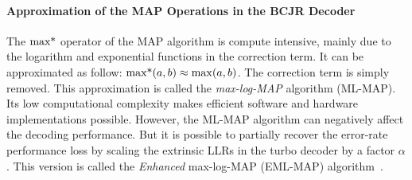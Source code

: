 

\paragraph{Approximation of the MAP Operations in the BCJR Decoder}


The $\operatorname*{max*}$ operator of the MAP algorithm is compute intensive, mainly due to
the logarithm and exponential functions in the correction term. It can be
approximated as follow: $\operatorname*{max*}(a,b) \approx \max(a,b)$. The correction term
is simply removed. This approximation is called the \emph{max-log-MAP} algorithm
(ML-MAP). Its low computational complexity makes efficient software and hardware
implementations possible. However, the ML-MAP algorithm can negatively affect
the decoding performance. But it is possible to partially recover the error-rate
performance loss by scaling the extrinsic LLRs in the turbo decoder by a factor
$\alpha$. This version is called the \emph{Enhanced} max-log-MAP (EML-MAP)
algorithm~\cite{Vogt2000,Studer2011}.

